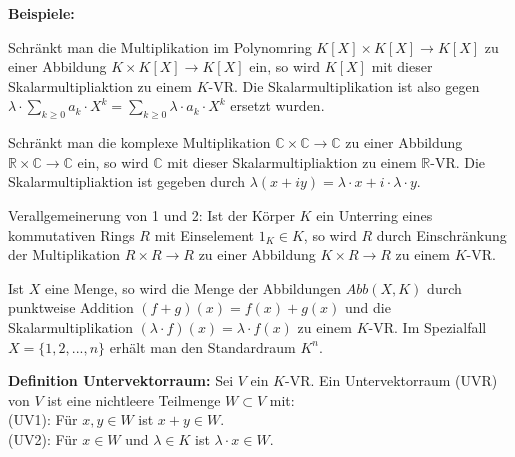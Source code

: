 \documentclass[11pt]{article}
\begin{document}
		\textbf{Beispiele:}
		\begin{compactitem}
			\item Schränkt man die Multiplikation im Polynomring $K[X] \times K[X] \to K[X]$ zu einer Abbildung $K \times K[X]
			\to K[X]$ ein, so wird $K[X]$ mit dieser Skalarmultipliaktion zu einem $K$-VR. Die Skalarmultiplikation ist also
			gegen $\lambda\cdot \sum \limits_{k\ge 0} a_k\cdot X^k = \sum \limits_{k\ge 0} \lambda\cdot a_k\cdot X^k$ ersetzt
			wurden.
			\item Schränkt man die komplexe Multiplikation $\mathbb C \times \mathbb C \to \mathbb C$ zu einer Abbildung 
			$\mathbb R \times \mathbb C \to \mathbb C$ ein, so wird $\mathbb C$ mit dieser Skalarmultipliaktion zu einem
			$\mathbb R$-VR. Die Skalarmultipliaktion ist gegeben durch $\lambda(x+iy)=\lambda\cdot x + i\cdot\lambda\cdot y$.
			\item Verallgemeinerung von 1 und 2: Ist der Körper $K$ ein Unterring eines kommutativen Rings $R$ mit Einselement 
			$1_K \in K$, so wird $R$ durch Einschränkung der Multiplikation $R \times R \to R$ zu einer Abbildung $K \times R
			\to R$ zu einem $K$-VR.
			\item Ist $X$ eine Menge, so wird die Menge der Abbildungen $Abb(X,K)$ durch punktweise Addition $(f+g)(x)=f(x)+
			g(x)$ und die Skalarmultiplikation $(\lambda\cdot f)(x)=\lambda\cdot f(x)$ zu einem $K$-VR. Im Spezialfall
			$X=\{1,2,...,n\}$ erhält man den Standardraum $K^n$.
		\end{compactitem}
		
		\begin{mdframed}[backgroundcolor=blue!20]
			\textbf{Definition Untervektorraum:} Sei $V$ ein $K$-VR. Ein Untervektorraum (UVR) von $V$ ist eine nichtleere
			Teilmenge $W \subset V$ mit: \\
			(UV1): Für $x,y \in W$ ist $x+y\in W$. \\
			(UV2): Für $x \in W$ und $\lambda \in K$ ist $\lambda\cdot x\in W$.
		\end{mdframed}
		
\end{document}
